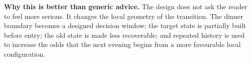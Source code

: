 \begin{example}
\textbf{Why this is better than generic advice.}
The design does not ask the reader to feel more serious. It changes the local
geometry of the transition. The dinner boundary becomes a designed decision
window; the target state is partially built before entry; the old state is made
less recoverable; and repeated history is used to increase the odds that the
next evening begins from a more favourable local configuration.
\end{example}
